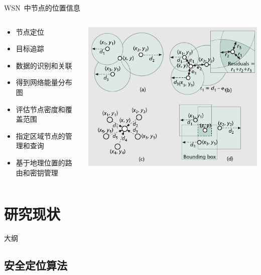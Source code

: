 \documentclass[mathserif,compress,CJKutf8, red]{beamer}
\begin{document}
\begin{CJK*}{UTF8}{song}
\begin{frame}{WSN~中节点的位置信息}
\begin{columns}
  \begin{column}{0.5\textwidth}
\begin{itemize}
\item 节点定位
\item 目标追踪
\item 数据的识别和关联
\item 得到网络能量分布图
\item 评估节点密度和覆盖范围
\item 指定区域节点的管理和查询
\item 基于地理位置的路由和密钥管理
\end{itemize}
  \end{column}
  \begin{column}{0.5\textwidth}
  \includegraphics[width=\textwidth]{images/localization.png}
  \end{column}
\end{columns}
\end{frame}

\section{研究现状}

\begin{frame}{大纲}
	\tableofcontents[currentsection]
\end{frame}

\subsection{安全定位算法}


\end{CJK*}
\end{document}
